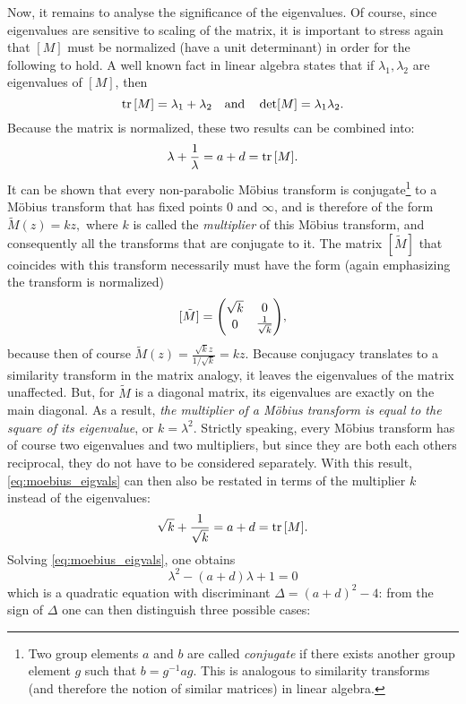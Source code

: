 Now, it remains to analyse the significance of the eigenvalues. Of course, since eigenvalues are sensitive to scaling of the matrix, it is important to stress again that \([M]\) must be normalized (have a unit determinant) in order for the following to hold. A well known fact in linear algebra states that if \(\lambda_1, \lambda_2\) are eigenvalues of \([M]\), then
\[ \trace{[M]} = \lambda_1 + \lambda_2 \quad\text{and}\quad \det [M]  = \lambda_1 \lambda_2.\]
Because the matrix is normalized, these two results can be combined into:
\begin{equation}
    \lambda + \frac{1}{\lambda} = a + d = \trace{[M]}.
    \label{eq:moebius_eigvals}
\end{equation}
It can be shown that every non-parabolic Möbius transform is conjugate\footnote{Two group elements \(a\) and \(b\) are called \emph{conjugate} if there exists another group element \(g\) such that \(b = g^{-1}ag\). This is analogous to similarity transforms (and therefore the notion of similar matrices) in linear algebra. } to a Möbius transform that has fixed points 0 and \(\infty\), and is therefore of the form
\(\tilde{M}(z) = kz,\)
where \(k\) is called the \emph{multiplier} of this Möbius transform, and consequently all the transforms that are conjugate to it. The matrix \([\tilde{M}]\) that coincides with this transform necessarily must have the form (again emphasizing the transform is normalized) \cite{Needham1997}
\[ [\tilde{M}] = \mqty(\dmat[0]{\sqrt{k}, \frac{1}{\sqrt{k}}}), \]
because then of course \(\tilde{M}(z) = \frac{\sqrt{k}z}{1/\sqrt{k}} = kz\). Because conjugacy translates to a similarity transform in the matrix analogy, it leaves the eigenvalues of the matrix unaffected. But, for \(\tilde{M}\) is a diagonal matrix, its eigenvalues are exactly on the main diagonal. As a result, \emph{the multiplier of a Möbius transform is equal to the square of its eigenvalue}, or \(k = \lambda^2\). Strictly speaking, every Möbius transform has of course two eigenvalues and two multipliers, but since they are both each others reciprocal, they do not have to be considered separately. With this result, \cref{eq:moebius_eigvals} can then also be restated in terms of the multiplier \(k\) instead of the eigenvalues:
    \[\sqrt{k} + \frac{1}{\sqrt{k}} = a + d = \trace{[M]}.\]
Solving \cref{eq:moebius_eigvals}, one obtains
 \[ \lambda^2 - (a + d)\lambda + 1 = 0\]
 which is a quadratic equation with discriminant \(\Delta = (a + d)^2 - 4\): from the sign of \(\Delta\) one can then distinguish three possible cases:

